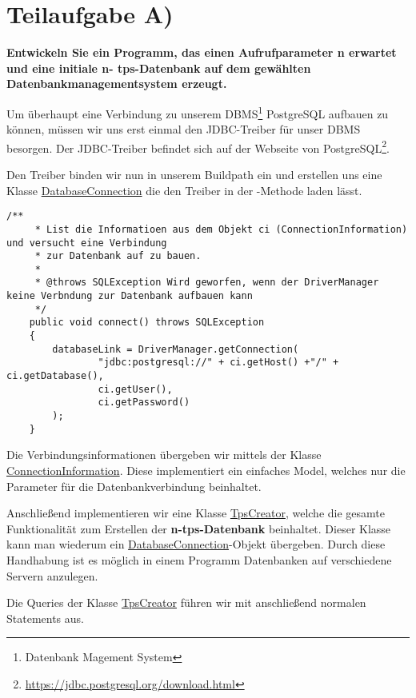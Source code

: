 \section{Teilaufgabe A)}
\textbf{Entwickeln Sie ein Programm, das einen Aufrufparameter n erwartet und eine initiale n-
tps-Datenbank auf dem gewählten Datenbankmanagementsystem erzeugt.}

Um überhaupt eine Verbindung zu unserem DBMS\footnote{Datenbank Magement
System} PostgreSQL aufbauen zu können, müssen wir uns erst einmal den
JDBC-Treiber für unser DBMS besorgen. Der JDBC-Treiber befindet sich auf der
Webseite von PostgreSQL\footnote{\url{https://jdbc.postgresql.org/download.html}}.

Den Treiber binden wir nun in unserem Buildpath ein und erstellen
uns eine Klasse \hyperref[lst:dbv2]{DatabaseConnection} die den Treiber in der
-Methode laden lässt.

\begin{lstlisting}[caption={connect Funktion}]
	/**
	 * List die Informatioen aus dem Objekt ci (ConnectionInformation) und versucht eine Verbindung 
	 * zur Datenbank auf zu bauen.
	 * 
	 * @throws SQLException Wird geworfen, wenn der DriverManager keine Verbndung zur Datenbank aufbauen kann
	 */
	public void connect() throws SQLException
	{
		databaseLink = DriverManager.getConnection(
				"jdbc:postgresql://" + ci.getHost() +"/" + ci.getDatabase(),
				ci.getUser(), 
				ci.getPassword()
		);
	}
\end{lstlisting}

Die Verbindungsinformationen übergeben wir mittels der Klasse
\hyperref[lst:civ2]{ConnectionInformation}. Diese implementiert ein einfaches
Model, welches nur die Parameter für die Datenbankverbindung beinhaltet.

Anschließend implementieren wir eine Klasse \hyperref[lst:tpsv2]{TpsCreator},
welche die gesamte Funktionalität zum Erstellen der \textbf{n-tps-Datenbank} beinhaltet.
Dieser Klasse kann man wiederum ein
\hyperref[lst:dbv2]{DatabaseConnection}-Objekt übergeben. Durch diese Handhabung
ist es möglich in einem Programm Datenbanken auf verschiedene Servern anzulegen.

Die Queries der Klasse \hyperref[lst:tpsv2]{TpsCreator}
führen wir mit anschließend normalen Statements aus. 


